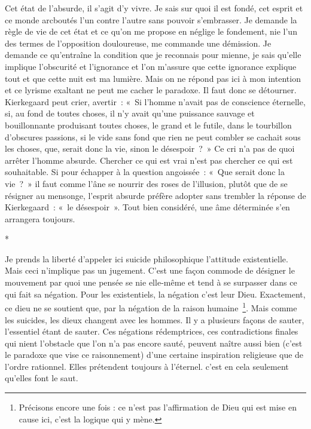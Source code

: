 \documentclass{book}
\begin{document}
Cet état de l'absurde, il s'agit d'y vivre. Je sais sur quoi il est fondé, cet esprit et ce monde arcboutés l'un contre l'autre sans pouvoir s'embrasser. Je demande la règle de vie de cet état et ce qu'on me propose en néglige le fondement, nie l'un des termes de l'opposition douloureuse, me commande une démission. Je demande ce qu'entraîne la condition que je reconnais pour mienne, je sais qu'elle implique l'obscurité et l'ignorance et l'on m'assure que cette ignorance explique tout et que cette nuit est ma lumière. Mais on ne répond pas ici à mon intention et ce lyrisme exaltant ne peut me cacher le paradoxe. Il faut donc se détourner. Kierkegaard peut crier, avertir : « Si l'homme n'avait pas de conscience éternelle, si, au fond de toutes choses, il n'y avait qu'une puissance sauvage et bouillonnante produisant toutes choses, le grand et le futile, dans le tourbillon d'obscures passions, si le vide sans fond que rien ne peut combler se cachait sous les choses, que, serait donc la vie, sinon le désespoir ? » Ce cri n'a pas de quoi arrêter l'homme absurde. Chercher ce qui est vrai n'est pas chercher ce qui est souhaitable. Si pour échapper à la question angoissée : « Que serait donc la vie ? » il faut comme l'âne se nourrir des roses de l'illusion, plutôt que de se résigner au mensonge, l'esprit absurde préfère adopter sans trembler la réponse de Kierkegaard : « le désespoir ». Tout bien considéré, une âme déterminée s'en arrangera toujours.

\begin{center}
*
\end{center}

Je prends la liberté d'appeler ici suicide philosophique l'attitude existentielle. Mais ceci n'implique pas un jugement. C'est une façon commode de désigner le mouvement par quoi une pensée se nie elle‑même et tend à se surpasser dans ce qui fait sa négation. Pour les existentiels, la négation c'est leur Dieu. Exactement, ce dieu ne se soutient que, par la négation de la raison humaine \footnote{Précisons encore une fois : ce n’est pas l’affirmation de Dieu qui est mise en cause ici, c’est la logique qui y mène.}. Mais comme les suicides, les dieux changent avec les hommes. Il y a plusieurs façons de sauter, l'essentiel étant de sauter. Ces négations rédemptrices, ces contradictions finales qui nient l'obstacle que l'on n'a pas encore sauté, peuvent naître aussi bien (c'est le paradoxe que vise ce raisonnement) d'une certaine inspiration religieuse que de l'ordre rationnel. Elles prétendent toujours à l'éternel. c'est en cela seulement qu'elles font le saut.
\end{document}
